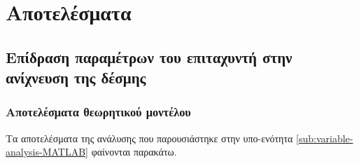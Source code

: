 \chapter{Αποτελέσματα}


\section{Επίδραση παραμέτρων του επιταχυντή στην ανίχνευση της δέσμης}

\subsection{Αποτελέσματα θεωρητικού μοντέλου}
Τα αποτελέσματα της ανάλυσης που παρουσιάστηκε στην υπο-ενότητα \ref{sub:variable-analysis-MATLAB} φαίνονται παρακάτω.

